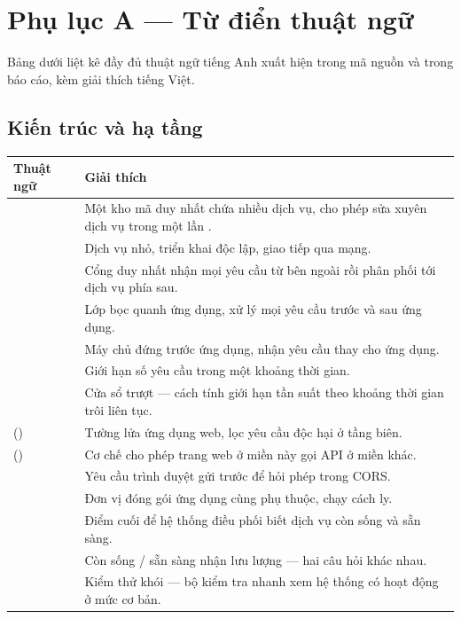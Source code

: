 \appendix
\chapter{Phụ lục A — Từ điển thuật ngữ}

Bảng dưới liệt kê đầy đủ thuật ngữ tiếng Anh xuất hiện trong mã nguồn và trong báo cáo,
kèm giải thích tiếng Việt.

\section{Kiến trúc và hạ tầng}

\begin{longtable}{L{4.2cm} L{9.4cm}}
\toprule
\textbf{Thuật ngữ} & \textbf{Giải thích}\\
\midrule
\endhead
{} & Một kho mã duy nhất chứa nhiều dịch vụ, cho phép sửa xuyên dịch vụ trong một lần .\\
 & Dịch vụ nhỏ, triển khai độc lập, giao tiếp qua mạng.\\
 & Cổng duy nhất nhận mọi yêu cầu từ bên ngoài rồi phân phối tới dịch vụ phía sau.\\
 & Lớp bọc quanh ứng dụng, xử lý mọi yêu cầu trước và sau ứng dụng.\\
 & Máy chủ đứng trước ứng dụng, nhận yêu cầu thay cho ứng dụng.\\
 & Giới hạn số yêu cầu trong một khoảng thời gian.\\
 & Cửa sổ trượt — cách tính giới hạn tần suất theo khoảng thời gian trôi liên tục.\\
 () & Tường lửa ứng dụng web, lọc yêu cầu độc hại ở tầng biên.\\
 () & Cơ chế cho phép trang web ở miền này gọi API ở miền khác.\\
 & Yêu cầu  trình duyệt gửi trước để hỏi phép trong CORS.\\
 & Đơn vị đóng gói ứng dụng cùng phụ thuộc, chạy cách ly.\\
 & Điểm cuối để hệ thống điều phối biết dịch vụ còn sống và sẵn sàng.\\
 & Còn sống / sẵn sàng nhận lưu lượng — hai câu hỏi khác nhau.\\
 & Kiểm thử khói — bộ kiểm tra nhanh xem hệ thống có hoạt động ở mức cơ bản.\\

\end{longtable}
